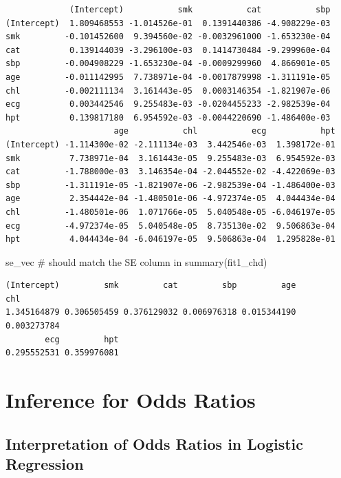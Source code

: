 \documentclass[
  letterpaper,
]{scrbook}
\newenvironment{Shaded}{\begin{snugshade}}{\end{snugshade}}
\newcommand{\CommentTok}[1]{\textcolor[rgb]{0.37,0.37,0.37}{#1}}
\newcommand{\NormalTok}[1]{\textcolor[rgb]{0.00,0.23,0.31}{#1}}
\begin{document}
\begin{verbatim}
             (Intercept)           smk           cat           sbp
(Intercept)  1.809468553 -1.014526e-01  0.1391440386 -4.908229e-03
smk         -0.101452600  9.394560e-02 -0.0032961000 -1.653230e-04
cat          0.139144039 -3.296100e-03  0.1414730484 -9.299960e-04
sbp         -0.004908229 -1.653230e-04 -0.0009299960  4.866901e-05
age         -0.011142995  7.738971e-04 -0.0017879998 -1.311191e-05
chl         -0.002111134  3.161443e-05  0.0003146354 -1.821907e-06
ecg          0.003442546  9.255483e-03 -0.0204455233 -2.982539e-04
hpt          0.139817180  6.954592e-03 -0.0044220690 -1.486400e-03
                      age           chl           ecg           hpt
(Intercept) -1.114300e-02 -2.111134e-03  3.442546e-03  1.398172e-01
smk          7.738971e-04  3.161443e-05  9.255483e-03  6.954592e-03
cat         -1.788000e-03  3.146354e-04 -2.044552e-02 -4.422069e-03
sbp         -1.311191e-05 -1.821907e-06 -2.982539e-04 -1.486400e-03
age          2.354442e-04 -1.480501e-06 -4.972374e-05  4.044434e-04
chl         -1.480501e-06  1.071766e-05  5.040548e-05 -6.046197e-05
ecg         -4.972374e-05  5.040548e-05  8.735130e-02  9.506863e-04
hpt          4.044434e-04 -6.046197e-05  9.506863e-04  1.295828e-01
\end{verbatim}

\begin{Shaded}
\begin{Highlighting}[]
\NormalTok{se\_vec  }\CommentTok{\# should match the SE column in summary(fit1\_chd)}
\end{Highlighting}
\end{Shaded}

\begin{verbatim}
(Intercept)         smk         cat         sbp         age         chl 
1.345164879 0.306505459 0.376129032 0.006976318 0.015344190 0.003273784 
        ecg         hpt 
0.295552531 0.359976081 
\end{verbatim}

\section{Inference for Odds Ratios}\label{inference-for-odds-ratios}

\subsection{Interpretation of Odds Ratios in Logistic
Regression}\label{interpretation-of-odds-ratios-in-logistic-regression}
\end{document}
